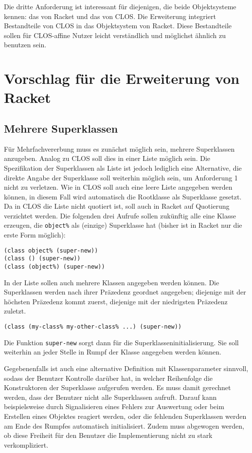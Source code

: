 Die dritte Anforderung ist interessant für diejenigen, die beide Objektsysteme kennen: das von Racket und das von CLOS. Die Erweiterung integriert Bestandteile von CLOS in das Objektsystem von Racket. Diese Bestandteile sollen für CLOS-affine Nutzer leicht verständlich und möglichst ähnlich zu benutzen sein.

\section{Vorschlag für die Erweiterung von Racket}

\subsection{Mehrere Superklassen}
Für Mehrfachvererbung muss es zunächst möglich sein, mehrere Superklassen anzugeben. Analog zu CLOS soll dies in einer Liste möglich sein. Die Spezifikation der Superklassen als Liste ist jedoch lediglich eine Alternative, die direkte Angabe der Superklasse soll weiterhin möglich sein, um Anforderung 1 nicht zu verletzen. Wie in CLOS soll auch eine leere Liste angegeben werden können, in diesem Fall wird automatisch die Rootklasse als Superklasse gesetzt. Da in CLOS die Liste nicht quotiert ist, soll auch in Racket auf Quotierung verzichtet werden. Die folgenden drei Aufrufe sollen zukünftig alle eine Klasse erzeugen, die \texttt{object\%} als (einzige) Superklasse hat (bisher ist in Racket nur die erste Form möglich):

\begin{lstlisting}
(class object% (super-new))
(class () (super-new))
(class (object%) (super-new))
\end{lstlisting}

In der Liste sollen auch mehrere Klassen angegeben werden können. Die Superklassen werden nach ihrer Präzedenz geordnet angegeben; diejenige mit der höchsten Präzedenz kommt zuerst, diejenige mit der niedrigsten Präzedenz zuletzt. 

\begin{lstlisting}
(class (my-class% my-other-class% ...) (super-new)) 
\end{lstlisting}

Die Funktion \texttt{super-new} sorgt dann für die Superklasseninitialisierung. Sie soll weiterhin an jeder Stelle in Rumpf der Klasse angegeben werden können. 

Gegebenenfalls ist auch eine alternative Definition mit Klassenparameter sinnvoll, sodass der Benutzer Kontrolle darüber hat, in welcher Reihenfolge die Konstruktoren der Superklasse aufgerufen werden. Es muss damit gerechnet werden, dass der Benutzer nicht alle Superklassen aufruft. Darauf kann beispielsweise durch Signalisieren eines Fehlers zur Auswertung oder beim Erstellen eines Objektes reagiert werden, oder die fehlenden Superklassen werden am Ende des Rumpfes automatisch initialisiert. Zudem muss abgewogen werden, ob diese Freiheit für den Benutzer die Implementierung nicht zu stark verkompliziert.

